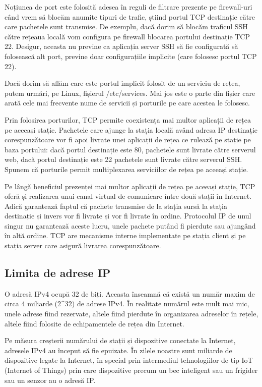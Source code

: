Noțiunea de port este folosită adesea în reguli de filtrare prezente pe firewall-uri când vrem să blocăm anumite tipuri de trafic, știind portul TCP destinație către care pachetele sunt transmise. De exemplu, dacă dorim să blocăm traficul SSH către rețeaua locală vom configura pe firewall blocarea portului destinație TCP 22. Desigur, aceasta nu previne ca aplicația server SSH să fie configurată să folosească alt port, previne doar configurațiile implicite (care folosesc portul TCP 22).

Dacă dorim să aflăm care este portul implicit folosit de un serviciu de rețea, putem urmări, pe Linux, fișierul /etc/services. Mai jos este o parte din fișier care arată cele mai frecvente nume de servicii și porturile pe care acestea le folosesc.

Prin folosirea porturilor, TCP permite coexistența mai multor aplicații de rețea pe aceeași stație. Pachetele care ajunge la stația locală având adresa IP destinație corespunzătoare vor fi apoi livrate unei aplicații de rețea ce rulează pe stație pe baza portului: dacă portul destinație este 80, pachetele sunt livrate către serverul web, dacă portul destinație este 22 pachetele sunt livrate către serverul SSH. Spunem că porturile permit multiplexarea serviciilor de rețea pe aceeași stație.

Pe lângă beneficiul prezenței mai multor aplicații de rețea pe aceeași stație, TCP oferă și realizarea unui canal virtual de comunicare între două stații în Internet. Adică garantează faptul că pachete transmise de la stația sursă la stația destinație și invers vor fi livrate și vor fi livrate în ordine. Protocolul IP de unul singur nu garantează aceste lucru, unele pachete putând fi pierdute sau ajungând în altă ordine. TCP are mecanisme interne implementate pe stația client și pe stația server care asigură livrarea corespunzătoare.

\subsection{Limita de adrese IP}
\label{sec:net:ip-limit}

O adresă IPv4 ocupă 32 de biți. Aceasta înseamnă că există un număr maxim de circa 4 miliarde (2^32) de adrese IPv4. În realitate numărul este mult mai mic, unele adrese fiind rezervate, altele fiind pierdute în organizarea adreselor în rețele, altele fiind folosite de echipamentele de rețea din Internet.

Pe măsura creșterii numărului de stații și dispozitive conectate la Internet, adresele IPv4 au început să fie epuizate. În zilele noastre sunt miliarde de dispozitive legate la Internet, în special prin intermediul tehnologiilor de tip IoT (Internet of Things) prin care dispozitive precum un bec inteligent sau un frigider sau un senzor au o adresă IP.

